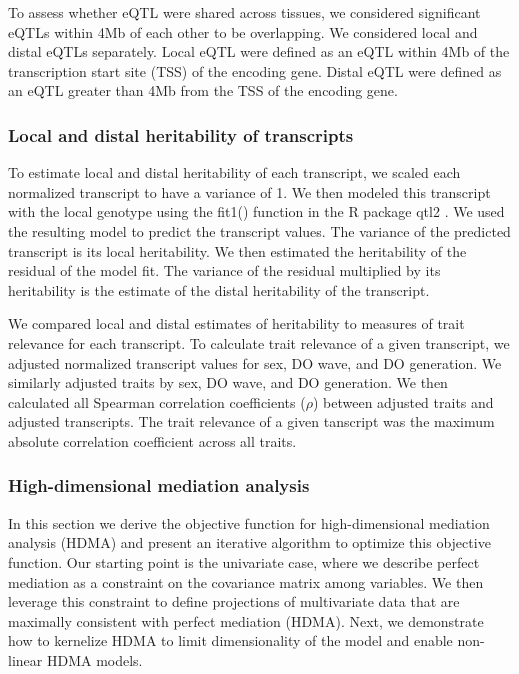 \documentclass[
]{article}
\begin{document}
To assess whether eQTL were shared across tissues, we considered
significant eQTLs within 4Mb of each other to be overlapping. We
considered local and distal eQTLs separately. Local eQTL were defined as
an eQTL within 4Mb of the transcription start site (TSS) of the encoding
gene. Distal eQTL were defined as an eQTL greater than 4Mb from the TSS
of the encoding gene.

\subsubsection{Local and distal heritability of
transcripts}\label{local-and-distal-heritability-of-transcripts}

To estimate local and distal heritability of each transcript, we scaled
each normalized transcript to have a variance of 1. We then modeled this
transcript with the local genotype using the fit1() function in the R
package qtl2 \cite{pmid30591514}. We used the resulting model to predict
the transcript values. The variance of the predicted transcript is its
local heritability. We then estimated the heritability of the residual
of the model fit. The variance of the residual multiplied by its
heritability is the estimate of the distal heritability of the
transcript.

We compared local and distal estimates of heritability to measures of
trait relevance for each transcript. To calculate trait relevance of a
given transcript, we adjusted normalized transcript values for sex, DO
wave, and DO generation. We similarly adjusted traits by sex, DO wave,
and DO generation. We then calculated all Spearman correlation
coefficients (\(\rho\)) between adjusted traits and adjusted
transcripts. The trait relevance of a given tanscript was the maximum
absolute correlation coefficient across all traits.

\subsubsection{High-dimensional mediation
analysis}\label{high-dimensional-mediation-analysis}

In this section we derive the objective function for high-dimensional
mediation analysis (HDMA) and present an iterative algorithm to optimize
this objective function. Our starting point is the univariate case,
where we describe perfect mediation as a constraint on the covariance
matrix among variables. We then leverage this constraint to define
projections of multivariate data that are maximally consistent with
perfect mediation (HDMA). Next, we demonstrate how to kernelize HDMA to
limit dimensionality of the model and enable non-linear HDMA models.
\end{document}
